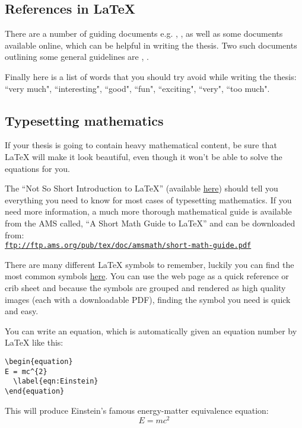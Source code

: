 \subsection{References in \LaTeX{}}
There are a number of guiding documents e.g. \cite{murray2006write}, \cite{evans2003write}, as well as some documents available online, which can be helpful in writing the thesis. Two such documents outlining some general guidelines are \cite{howtothesis}, \cite{getthesis}.

Finally here is a list of words that you should try avoid while writing the thesis: ``very much", ``interesting", ``good", ``fun", ``exciting", ``very", ``too much".

\subsection{Typesetting mathematics}

If your thesis is going to contain heavy mathematical content, be sure that \LaTeX{} will make it look beautiful, even though it won't be able to solve the equations for you.

The ``Not So Short Introduction to \LaTeX{}'' (available \href{http://www.ctan.org/tex-archive/info/lshort/english/lshort.pdf}{here}) should tell you everything you need to know for most cases of typesetting mathematics. If you need more information, a much more thorough mathematical guide is available from the AMS called, ``A Short Math Guide to \LaTeX{}'' and can be downloaded from:\\
\href{ftp://ftp.ams.org/pub/tex/doc/amsmath/short-math-guide.pdf}{\texttt{ftp://ftp.ams.org/pub/tex/doc/amsmath/short-math-guide.pdf}}

There are many different \LaTeX{} symbols to remember, luckily you can find the most common symbols \href{http://www.sunilpatel.co.uk/latexsymbols.html}{here}. You can use the web page as a quick reference or crib sheet and because the symbols are grouped and rendered as high quality images (each with a downloadable PDF), finding the symbol you need is quick and easy.

You can write an equation, which is automatically given an equation number by \LaTeX{} like this:
\begin{verbatim}
\begin{equation}
E = mc^{2}
  \label{eqn:Einstein}
\end{equation}
\end{verbatim}

This will produce Einstein's famous energy-matter equivalence equation:
\begin{equation}
E = mc^{2}
\label{eqn:Einstein}
\end{equation}

